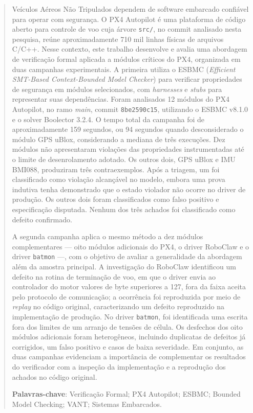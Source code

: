 \begin{abstract}

Veículos Aéreos Não Tripulados dependem de software embarcado confiável para operar com segurança. O PX4 Autopilot é uma plataforma de código aberto para controle de voo cuja árvore \texttt{src/}, no commit analisado nesta pesquisa, reúne aproximadamente 710 mil linhas físicas de arquivos C/C++. Nesse contexto, este trabalho desenvolve e avalia uma abordagem de verificação formal aplicada a módulos críticos do PX4, organizada em duas campanhas experimentais. A primeira utiliza o ESBMC (\textit{Efficient SMT-Based Context-Bounded Model Checker}) para verificar propriedades de segurança em módulos selecionados, com \textit{harnesses} e \textit{stubs} para representar suas dependências. Foram analisados 12 módulos do PX4 Autopilot, no ramo \textit{main}, commit \texttt{8be2590c15}, utilizando o ESBMC v8.1.0 e o solver Boolector 3.2.4. O tempo total da campanha foi de aproximadamente 159 segundos, ou 94 segundos quando desconsiderado o módulo GPS uBlox, considerando a mediana de três execuções. Dez módulos não apresentaram violações das propriedades instrumentadas até o limite de desenrolamento adotado. Os outros dois, GPS uBlox e IMU BMI088, produziram três contraexemplos. Após a triagem, um foi classificado como violação alcançável no modelo, embora uma prova indutiva tenha demonstrado que o estado violador não ocorre no driver de produção. Os outros dois foram classificados como falso positivo e especificação disputada. Nenhum dos três achados foi classificado como defeito confirmado.

A segunda campanha aplica o mesmo método a dez módulos complementares --- oito módulos adicionais do PX4, o driver RoboClaw e o driver \texttt{batmon} ---, com o objetivo de avaliar a generalidade da abordagem além da amostra principal. A investigação do RoboClaw identificou um defeito na rotina de terminação de voo, em que o driver envia ao controlador do motor valores de byte superiores a 127, fora da faixa aceita pelo protocolo de comunicação; a ocorrência foi reproduzida por meio de \textit{replay} no código original, caracterizando um defeito reproduzido na implementação de produção. No driver \texttt{batmon}, foi identificada uma escrita fora dos limites de um arranjo de tensões de célula. Os desfechos dos oito módulos adicionais foram heterogêneos, incluindo duplicatas de defeitos já corrigidos, um falso positivo e casos de baixa severidade. Em conjunto, as duas campanhas evidenciam a importância de complementar os resultados do verificador com a inspeção da implementação e a reprodução dos achados no código original.

\noindent
\textbf{Palavras-chave}: Verificação Formal; PX4 Autopilot; ESBMC; Bounded Model Checking; VANT; Sistemas Embarcados.
\end{abstract}

